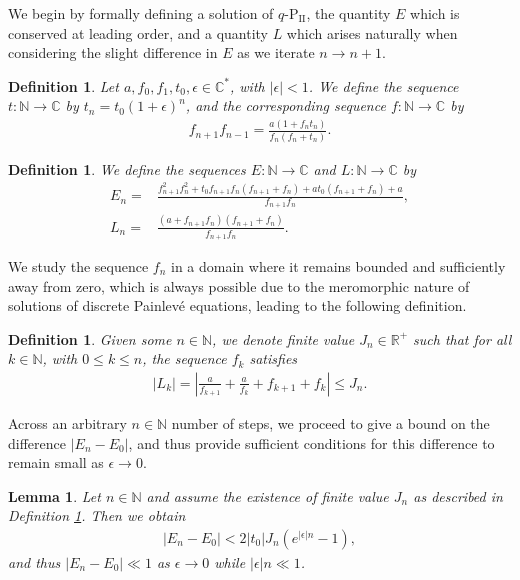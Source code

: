 \documentclass[reqno,a4paper]{amsart}
\numberwithin{equation}{section}
\theoremstyle{plain}
\newtheorem{lemma}[theorem]{Lemma}
\newtheorem{definition}[theorem]{Definition}
\theoremstyle{remark}
\newcommand\Ptwo{\textrm{P}_{\textrm{II}}}
\begin{document}
We begin by formally defining a solution of $q$-$\Ptwo$, the quantity $E$ which is conserved at leading order, and a quantity $L$ which arises naturally when considering the slight difference in $E$ as we iterate $n\to n+1$.
\begin{definition}\label{def:f}
    Let $a,f_0,f_1,t_0,\epsilon\in\mathbb{C}^*$, with $|\epsilon|<1$. We define the sequence $t:\mathbb{N}\rightarrow\mathbb{C}$ by $t_n=t_0(1+\epsilon)^n$, and the corresponding sequence $f:\mathbb{N}\rightarrow\mathbb{C}$ by
    \begin{align}\label{eq:qP2}
        f_{n+1}f_{n-1}=\frac{a(1+f_nt_n)}{f_n(f_n+t_n)}.
    \end{align}
\end{definition}
\begin{definition}\label{def:E}
    We define the sequences $E:\mathbb{N}\rightarrow\mathbb{C}$ and $L:\mathbb{N}\rightarrow\mathbb{C}$ by
    \begin{align}\label{eq:invariant}
        E_n=&\frac{f_{n+1}^2f_n^2+t_0f_{n+1}f_n(f_{n+1}+f_n)+at_0(f_{n+1}+f_{n})+a}{f_{n+1}f_n},\\
        L_n=&\frac{(a+f_{n+1}f_n)(f_{n+1}+f_n)}{f_{n+1}f_n}.
    \end{align}    
\end{definition}
We study the sequence $f_n$ in a domain where it remains bounded and sufficiently away from zero, which is always possible due to the meromorphic nature of solutions of discrete Painlev\'e equations, leading to the following definition.
\begin{definition}\label{def:bounds}
    Given some $n\in\mathbb{N}$, we denote finite value $J_n\in\mathbb{R}^+$ such that for all $k\in\mathbb{N}$, with $0\leq k\leq n$, the sequence $f_k$ satisfies
    \begin{align*}
        \left|L_k\right|=\left|\frac{a}{f_{k+1}}+\frac{a}{f_k}+f_{k+1}+f_k\right|\leq J_n.
    \end{align*}
\end{definition}
Across an arbitrary $n\in\mathbb{N}$ number of steps, we proceed to give a bound on the difference $|E_n-E_{0}|$, and thus provide sufficient conditions for this difference to remain small as $\epsilon\to0$.
\begin{lemma}\label{lem:LOEq}
    Let $n\in\mathbb{N}$ and assume the existence of finite value $J_n$ as described in Definition \ref{def:bounds}. Then we obtain
    \begin{align*}
        |E_n-E_0|<2\left|t_0\right|J_n\left(e^{|\epsilon|n}-1\right),
    \end{align*}
    and thus $|E_n-E_{0}|\ll 1$ as $\epsilon\to0$ while $|\epsilon|n\ll1$.
\end{lemma}
\end{document}
